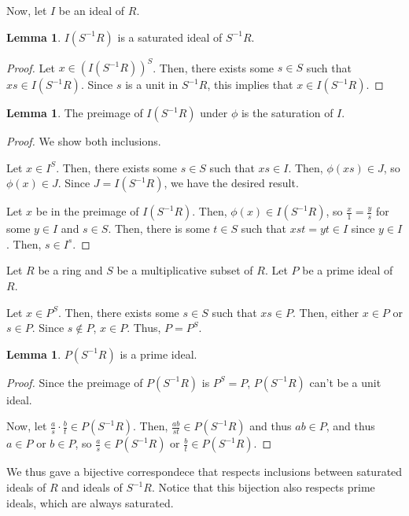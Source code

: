 \documentclass{article}
\theoremstyle{definition}
\newtheorem{lemma}[theorem]{Lemma}
\begin{document}
Now, let $ I $ be an ideal of $ R $.

\begin{lemma}
    $ I (S^{-1}R) $ is a saturated ideal of $ S^{-1}R $.
\end{lemma}
\begin{proof}
    Let $ x \in (I (S^{-1}R))^{S} $.
    Then, there exists some $ s \in S $ such that $ xs \in I (S^{-1}R) $.
    Since $ s $ is a unit in $ S^{-1}R $, this implies that $ x \in I (S^{-1}R) $.
\end{proof}

\begin{lemma}
    The preimage of $ I (S^{-1}R) $ under $ \phi $ is the
    saturation of $ I $.
\end{lemma}
\begin{proof}
    We show both inclusions.

    Let $ x \in I^{S} $. Then, there exists some $ s \in S $
    such that $ xs \in I $. Then, $ \phi(xs) \in J $, so $ \phi(x) \in J $.
    Since $ J = I (S^{-1}R) $, we have the desired result.

    Let $ x $ be in the preimage of $ I (S^{-1}R) $.
    Then, $ \phi(x) \in I (S^{-1}R) $, so $ \frac{x}{1} = \frac{y}{s} $
    for some $ y \in I $ and $ s \in S $. Then, there is some $ t \in S $
    such that $ xst = yt \in I $ since $ y \in I $.
    Then, $ s \in I^{s} $.
\end{proof}

Let $ R $ be a ring and $ S $ be a multiplicative subset of $ R $.
Let $ P $ be a prime ideal of $ R $.

Let $ x \in P^{S} $. Then, there exists some $ s \in S $ such that $ xs \in P $.
Then, either $ x \in P $ or $ s \in P $. Since $ s \notin P $, $ x \in P $.
Thus, $ P = P^{S} $.

\begin{lemma}
    $ P (S^{-1}R) $ is a prime ideal.
\end{lemma}
\begin{proof}
    Since the preimage of $ P (S^{-1}R) $ is $ P^{S} = P $, $ P (S^{-1}R) $ can't be a unit ideal.
    
    Now, let $ \frac{a}{s} \cdot \frac{b}{t} \in P (S^{-1}R) $.
    Then, $ \frac{ab}{st} \in P (S^{-1}R) $ and thus $ ab \in P $,
    and thus $ a \in P $ or $ b \in P $, so $ \frac{a}{s} \in P (S^{-1}R) $
    or $ \frac{b}{t} \in P (S^{-1}R) $.
\end{proof}

We thus gave a bijective correspondece that respects inclusions
between saturated ideals of $ R $ and ideals of $ S^{-1}R $.
Notice that this bijection also respects prime ideals, which are
always saturated.
\end{document}
